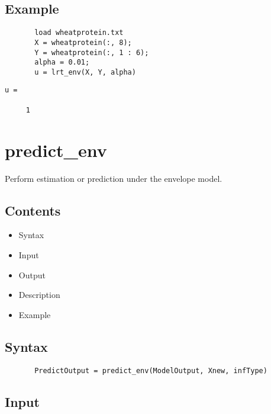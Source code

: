\documentclass[a4paper,11pt,openany]{memoir}
\begin{document}
\subsection*{Example}


\begin{verbatim}       load wheatprotein.txt
       X = wheatprotein(:, 8);
       Y = wheatprotein(:, 1 : 6);
       alpha = 0.01;
       u = lrt_env(X, Y, alpha)\end{verbatim}
    
        \color{lightgray}\ttfamily \begin{verbatim}
u =

     1

\end{verbatim} \rmfamily
\color{black}
    
\newpage


\rmfamily
\color{black}\section{predict\_env}

\begin{par}
Perform estimation or prediction under the envelope model.
\end{par} \vspace{1em}

\subsection*{Contents}

\begin{itemize}
\setlength{\itemsep}{-1ex}
   \item Syntax
   \item Input
   \item Output
   \item Description
   \item Example
\end{itemize}


\subsection*{Syntax}


\begin{verbatim}       PredictOutput = predict_env(ModelOutput, Xnew, infType)\end{verbatim}
    

\subsection*{Input}
\end{document}
